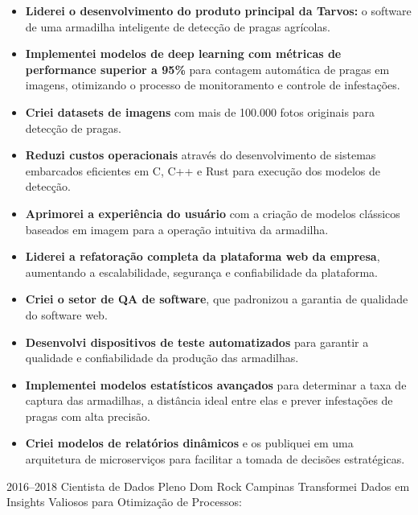 \documentclass[11pt,a4paper,sans]{moderncv}        %
\begin{document}
\begin{itemize}%
  \item \textbf{Liderei o desenvolvimento do produto principal da Tarvos:} o software de uma armadilha inteligente de detecção de pragas agrícolas.
  \item \textbf{Implementei modelos de deep learning com métricas de performance superior a 95\%} para contagem automática de pragas em imagens, otimizando o processo de monitoramento e controle de infestações.
  \item \textbf{Criei datasets de imagens} com mais de 100.000 fotos originais para detecção de pragas.
  \item \textbf{Reduzi custos operacionais} através do desenvolvimento de sistemas embarcados eficientes em C, C++ e Rust para execução dos modelos de detecção.
  \item \textbf{Aprimorei a experiência do usuário} com a criação de modelos clássicos baseados em imagem para a operação intuitiva da armadilha.
  \item \textbf{Liderei a refatoração completa da plataforma web da empresa}, aumentando a escalabilidade, segurança e confiabilidade da plataforma.
  \item \textbf{Criei o setor de QA de software}, que padronizou a garantia de qualidade do software web.
  \item \textbf{Desenvolvi dispositivos de teste automatizados} para garantir a qualidade e confiabilidade da produção das armadilhas.
  \item \textbf{Implementei modelos estatísticos avançados} para determinar a taxa de captura das armadilhas, a distância ideal entre elas e prever infestações de pragas com alta precisão.
  \item \textbf{Criei modelos de relatórios dinâmicos} e os publiquei em uma arquitetura de microserviços para facilitar a tomada de decisões estratégicas.

\end{itemize}

\vspace{1em}
\cventry
{2016--2018}
{Cientista de Dados Pleno}
{Dom Rock}
{Campinas}{}
{Transformei Dados em Insights Valiosos para Otimização de Processos:}
\end{document}
